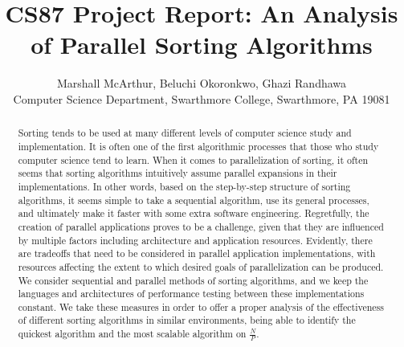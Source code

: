 \documentclass[11pt,twocolumn]{article}
\begin{document}
\title{CS87 Project Report: 
An Analysis of Parallel Sorting Algorithms}

\author{Marshall McArthur, Beluchi Okoronkwo, Ghazi Randhawa \\
Computer Science Department, Swarthmore College, Swarthmore, PA  19081}

\maketitle

\begin{abstract}

  

Sorting tends to be used at many different levels of computer science study and implementation. It is often one of the first algorithmic processes that those who study computer science tend to learn. When it comes to parallelization of sorting, it often seems that sorting algorithms intuitively assume parallel expansions in their implementations. In other words, based on the step-by-step structure of sorting algorithms, it seems simple to take a sequential algorithm, use its general processes, and ultimately make it faster with some extra software engineering. Regretfully, the creation of parallel applications proves to be a challenge, given that they are influenced by multiple factors including architecture and application resources. Evidently, there are tradeoffs that need to be considered in parallel application implementations, with resources affecting the extent to which desired goals of parallelization can be produced. We consider sequential and parallel methods of sorting algorithms, and we keep the languages and architectures of performance testing between these implementations constant. We take these measures in order to offer a proper analysis of the effectiveness of different sorting algorithms in similar environments, being able to identify the quickest algorithm and the most scalable algorithm on $\frac{N}{P}$.


\end{abstract}
\end{document}
